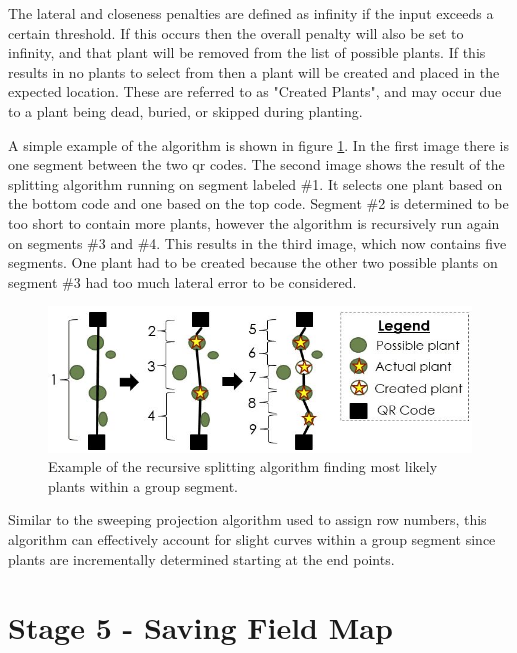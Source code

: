 The lateral and closeness penalties are defined as infinity if the input exceeds a certain threshold.  If this occurs then the overall penalty will also be set to infinity, and that plant will be removed from the list of possible plants.  If this results in no plants to select from then a plant will be created and placed in the expected location.  These are referred to as "Created Plants", and may occur due to a plant being dead, buried, or skipped during planting.  

A simple example of the algorithm is shown in figure \ref{figure:recursive_algorithm}.  In the first image there is one segment between the two \ac{qr} codes.  The second image shows the result of the splitting algorithm running on segment labeled \#1. It selects one plant based on the bottom code and one based on the top code.  Segment \#2 is determined to be too short to contain more plants, however the algorithm is recursively run again on segments \#3 and \#4.  This results in the third image, which now contains five segments.  One plant had to be created because the other two possible plants on segment \#3 had too much lateral error to be considered.   

\begin{figure}
	\centering
    \includegraphics[width=5in]{figures/recursive_algorithm2.jpg}
    \caption[Recursive splitting algorithm]{Example of the recursive splitting algorithm finding most likely plants within a group segment.}
    \label{figure:recursive_algorithm}
\end{figure}

Similar to the sweeping projection algorithm used to assign row numbers, this algorithm can effectively account for slight curves within a group segment since plants are incrementally determined starting at the end points. 

\section{Stage 5 - Saving Field Map}
\label{processing-stage5}

